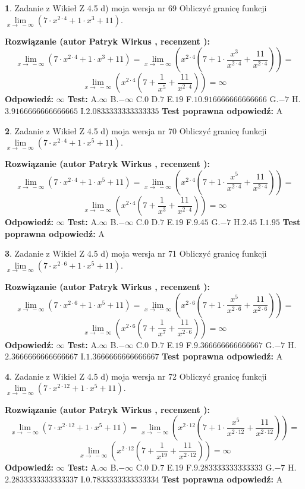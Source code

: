\documentclass[12pt, a4paper]{article}
\theoremstyle{definition} %
\newtheorem{zad}{}
\newcommand{\zadStart}[1]{\begin{zad}#1\newline}
\newcommand{\zadStop}{\end{zad}}
\newcommand{\rozwStart}[2]{\noindent \textbf{Rozwiązanie (autor #1 , recenzent #2): }\newline}
\newcommand{\rozwStop}{\newline}
\newcommand{\odpStart}{\noindent \textbf{Odpowiedź:}\newline}
\newcommand{\odpStop}{\newline}
\newcommand{\testStart}{\noindent \textbf{Test:}\newline}
\newcommand{\testStop}{\newline}
\newcommand{\kluczStart}{\noindent \textbf{Test poprawna odpowiedź:}\newline}
\newcommand{\kluczStop}{\newline}
\begin{document}
\zadStart{Zadanie z Wikieł Z 4.5 d) moja wersja nr 69}
Obliczyć granicę funkcji  $\lim\limits_{x\to\ -\infty}(7 \cdot x^{2\cdot4}+1 \cdot x^{3}+11)$.
\zadStop
\rozwStart{Patryk Wirkus}{}
$$\lim\limits_{x\to\ -\infty}(7 \cdot x^{2\cdot4}+1 \cdot x^{3}+11) = \lim\limits_{x\to\ -\infty}(x^{2\cdot4}(7 +1 \cdot \frac{x^{3}}{x^{2\cdot4}}+\frac{11}{x^{2\cdot4}})) =$$ $$\lim\limits_{x\to\ -\infty}(x^{2\cdot4}(7 +\frac{1}{x^{5}}+\frac{11}{x^{2\cdot4}})) =\infty$$
\rozwStop
\odpStart
$\infty$
\odpStop
\testStart
A.$\infty$ B.$-\infty$ C.$0$ D.$7$ E.$19$
F.$10.916666666666666$ G.$-7$
H.$3.9166666666666665$
I.$2.0833333333333335$
\testStop
\kluczStart
A
\kluczStop



\zadStart{Zadanie z Wikieł Z 4.5 d) moja wersja nr 70}
Obliczyć granicę funkcji  $\lim\limits_{x\to\ -\infty}(7 \cdot x^{2\cdot4}+1 \cdot x^{5}+11)$.
\zadStop
\rozwStart{Patryk Wirkus}{}
$$\lim\limits_{x\to\ -\infty}(7 \cdot x^{2\cdot4}+1 \cdot x^{5}+11) = \lim\limits_{x\to\ -\infty}(x^{2\cdot4}(7 +1 \cdot \frac{x^{5}}{x^{2\cdot4}}+\frac{11}{x^{2\cdot4}})) =$$ $$\lim\limits_{x\to\ -\infty}(x^{2\cdot4}(7 +\frac{1}{x^{3}}+\frac{11}{x^{2\cdot4}})) =\infty$$
\rozwStop
\odpStart
$\infty$
\odpStop
\testStart
A.$\infty$ B.$-\infty$ C.$0$ D.$7$ E.$19$
F.$9.45$ G.$-7$
H.$2.45$
I.$1.95$
\testStop
\kluczStart
A
\kluczStop



\zadStart{Zadanie z Wikieł Z 4.5 d) moja wersja nr 71}
Obliczyć granicę funkcji  $\lim\limits_{x\to\ -\infty}(7 \cdot x^{2\cdot6}+1 \cdot x^{5}+11)$.
\zadStop
\rozwStart{Patryk Wirkus}{}
$$\lim\limits_{x\to\ -\infty}(7 \cdot x^{2\cdot6}+1 \cdot x^{5}+11) = \lim\limits_{x\to\ -\infty}(x^{2\cdot6}(7 +1 \cdot \frac{x^{5}}{x^{2\cdot6}}+\frac{11}{x^{2\cdot6}})) =$$ $$\lim\limits_{x\to\ -\infty}(x^{2\cdot6}(7 +\frac{1}{x^{7}}+\frac{11}{x^{2\cdot6}})) =\infty$$
\rozwStop
\odpStart
$\infty$
\odpStop
\testStart
A.$\infty$ B.$-\infty$ C.$0$ D.$7$ E.$19$
F.$9.366666666666667$ G.$-7$
H.$2.3666666666666667$
I.$1.3666666666666667$
\testStop
\kluczStart
A
\kluczStop



\zadStart{Zadanie z Wikieł Z 4.5 d) moja wersja nr 72}
Obliczyć granicę funkcji  $\lim\limits_{x\to\ -\infty}(7 \cdot x^{2\cdot12}+1 \cdot x^{5}+11)$.
\zadStop
\rozwStart{Patryk Wirkus}{}
$$\lim\limits_{x\to\ -\infty}(7 \cdot x^{2\cdot12}+1 \cdot x^{5}+11) = \lim\limits_{x\to\ -\infty}(x^{2\cdot12}(7 +1 \cdot \frac{x^{5}}{x^{2\cdot12}}+\frac{11}{x^{2\cdot12}})) =$$ $$\lim\limits_{x\to\ -\infty}(x^{2\cdot12}(7 +\frac{1}{x^{19}}+\frac{11}{x^{2\cdot12}})) =\infty$$
\rozwStop
\odpStart
$\infty$
\odpStop
\testStart
A.$\infty$ B.$-\infty$ C.$0$ D.$7$ E.$19$
F.$9.283333333333333$ G.$-7$
H.$2.2833333333333337$
I.$0.7833333333333334$
\testStop
\kluczStart
A
\kluczStop
\end{document}
